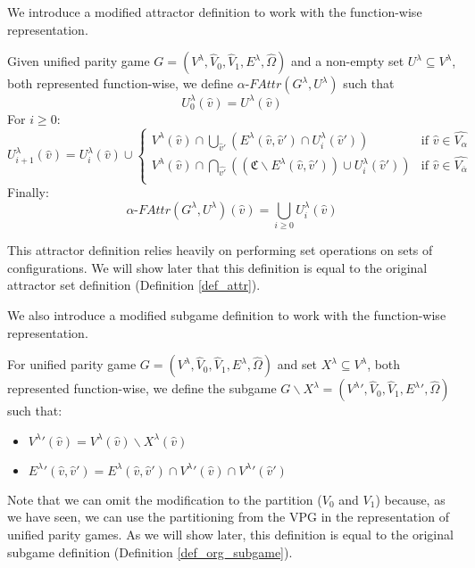 We introduce a modified attractor definition to work with the function-wise representation.
\begin{definition}
		\label{def_Uattr}Given unified parity game $G = (V^\lambda, \hat{V}_0,\hat{V}_1,E^\lambda,\hat{\Omega})$ and a non-empty set $U^\lambda \subseteq V^\lambda$, both represented function-wise, we define $\alpha\textit{-FAttr}(G^\lambda,U^\lambda)$ such that
	\[U^\lambda_0(\hat{v}) = U^\lambda(\hat{v}) \]
	For $i \geq 0$:
	\[
	U^\lambda_{i+1}(\hat{v}) = U^\lambda_i(\hat{v}) \cup \begin{cases}
V^\lambda(\hat{v}) \cap \bigcup_{\hat{v}'} (E^\lambda(\hat{v},\hat{v}') \cap U^\lambda_i(\hat{v}')) & \text{if } \hat{v} \in \hat{V_{\alpha}}\\
V^\lambda(\hat{v}) \cap \bigcap_{\hat{v'}}((\mathfrak{C} \backslash E^\lambda(\hat{v},\hat{v}')) \cup U^\lambda_i(\hat{v}')) & \text{if }\hat{v} \in  \hat{V_{\overline{\alpha}}} \\
	\end{cases}
	\]
	Finally:
	\[\alpha\textit{-FAttr}(G^\lambda,U^\lambda)(\hat{v}) = \bigcup_{i \geq 0} U^\lambda_i(\hat{v}) \]
\end{definition}
This attractor definition relies heavily on performing set operations on sets of configurations. We will show later that this definition is equal to the original attractor set definition (Definition \ref{def_attr}). 

We also introduce a modified subgame definition to work with the function-wise representation.
\begin{definition}
	\label{def_Usubgame}
	For unified parity game $G = (V^\lambda,\hat{V}_0,\hat{V}_1,E^\lambda,\hat{\Omega})$ and set $X^\lambda \subseteq V^\lambda$, both represented function-wise, we define the subgame $G \backslash X^\lambda = ({V^\lambda}',\hat{V}_0,\hat{V}_1,{E^\lambda}',\hat{\Omega})$ such that:
	\begin{itemize}
		\item ${V^\lambda}'(\hat{v}) = V^\lambda(\hat{v}) \backslash X^\lambda(\hat{v})$
		\item ${E^\lambda}'(\hat{v},\hat{v}') = E^\lambda(\hat{v},\hat{v}') \cap {V^\lambda}'(\hat{v}) \cap {V^\lambda}'(\hat{v}')$
	\end{itemize}
\end{definition}
Note that we can omit the modification to the partition ($V_0$ and $V_1$) because, as we have seen, we can use the partitioning from the VPG in the representation of unified parity games. As we will show later, this definition is equal to the original subgame definition (Definition \ref{def_org_subgame}).

